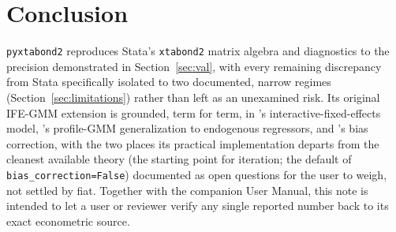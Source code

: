 \documentclass[11pt,a4paper]{article}
\newcommand{\pkg}{\texttt{pyxtabond2}}
\begin{document}
\section{Conclusion}

\pkg{} reproduces Stata's \texttt{xtabond2} matrix algebra and diagnostics
to the precision demonstrated in Section~\ref{sec:val}, with every
remaining discrepancy from Stata specifically isolated to two documented,
narrow regimes (Section~\ref{sec:limitations}) rather than left as an
unexamined risk. Its original IFE-GMM extension is grounded, term for term,
in \citet{Bai2009}'s interactive-fixed-effects model,
\citet{HongSuJiang2022}'s profile-GMM generalization to endogenous
regressors, and \citet{DhaeneJochmans2015}'s bias correction, with the two
places its practical implementation departs from the cleanest available
theory (the starting point for iteration; the default of
\texttt{bias\_correction=False}) documented as open questions for the user
to weigh, not settled by fiat. Together with the companion User Manual, this
note is intended to let a user or reviewer verify any single reported number
back to its exact econometric source.



\end{document}
